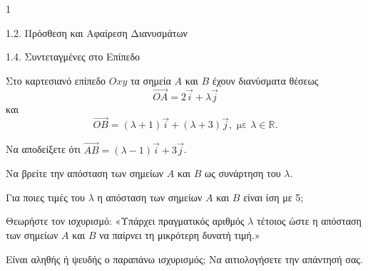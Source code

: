 \begin{ylh}{1}
    \item 1.2. Πρόσθεση και Αφαίρεση Διανυσμάτων
    \item 1.4. Συντεταγμένες στο Επίπεδο
\end{ylh}
Στο καρτεσιανό επίπεδο $Oxy$ τα σημεία $A$ και $B$ έχουν διανύσματα θέσεως
\[ \vec{OA} = 2\vec{i} + \lambda\vec{j} \]
και
\[ \vec{OB} = (\lambda + 1)\vec{i} + (\lambda + 3)\vec{j}, \text{ με } \lambda \in \mathbb{R}. \]
\begin{alist}
    \item Να αποδείξετε ότι $\vec{AB} = (\lambda - 1)\vec{i} + 3\vec{j}$. 
    \item Να βρείτε την απόσταση των σημείων $A$ και $B$ ως συνάρτηση του $\lambda$. 
    \item Για ποιες τιμές του $\lambda$ η απόσταση των σημείων $A$ και $B$ είναι ίση με 5; 
    \item Θεωρήστε τον ισχυρισμό: «Υπάρχει πραγματικός αριθμός $\lambda$ τέτοιος ώστε η απόσταση των σημείων $A$ και $B$ να παίρνει τη μικρότερη δυνατή τιμή.»

    Είναι αληθής ή ψευδής ο παραπάνω ισχυρισμός; Να αιτιολογήσετε την απάντησή σας. 
\end{alist}